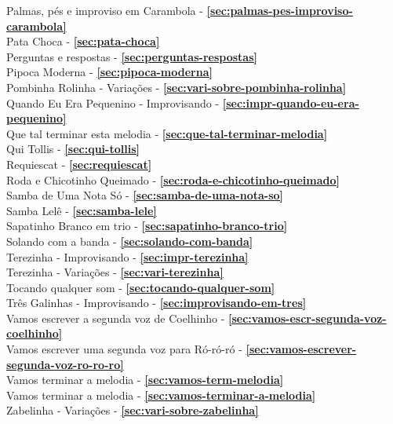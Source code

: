 Palmas, pés e improviso em Carambola - \textbf{\ref{sec:palmas-pes-improviso-carambola}} \\
Pata Choca - \textbf{\ref{sec:pata-choca}} \\
Perguntas e respostas - \textbf{\ref{sec:perguntas-respostas}} \\
Pipoca Moderna - \textbf{\ref{sec:pipoca-moderna}} \\
Pombinha Rolinha - Variações - \textbf{\ref{sec:vari-sobre-pombinha-rolinha}} \\
Quando Eu Era Pequenino - Improvisando - \textbf{\ref{sec:impr-quando-eu-era-pequenino}} \\
Que tal terminar esta melodia - \textbf{\ref{sec:que-tal-terminar-melodia}} \\
Qui Tollis - \textbf{\ref{sec:qui-tollis}} \\
Requiescat - \textbf{\ref{sec:requiescat}} \\
Roda e Chicotinho Queimado - \textbf{\ref{sec:roda-e-chicotinho-queimado}} \\
Samba de Uma Nota Só - \textbf{\ref{sec:samba-de-uma-nota-so}} \\
Samba Lelê - \textbf{\ref{sec:samba-lele}} \\
Sapatinho Branco em trio - \textbf{\ref{sec:sapatinho-branco-trio}} \\
Solando com a banda - \textbf{\ref{sec:solando-com-banda}} \\
Terezinha - Improvisando - \textbf{\ref{sec:impr-terezinha}} \\
Terezinha - Variações - \textbf{\ref{sec:vari-terezinha}} \\
Tocando qualquer som - \textbf{\ref{sec:tocando-qualquer-som}} \\
Três Galinhas - Improvisando - \textbf{\ref{sec:improvisando-em-tres}} \\
Vamos escrever a segunda voz de Coelhinho - \textbf{\ref{sec:vamos-escr-segunda-voz-coelhinho}} \\
Vamos escrever uma segunda voz para Ró-ró-ró - \textbf{\ref{sec:vamos-escrever-segunda-voz-ro-ro-ro}} \\
Vamos terminar a melodia - \textbf{\ref{sec:vamos-term-melodia}} \\
Vamos terminar a melodia - \textbf{\ref{sec:vamos-terminar-a-melodia}} \\
Zabelinha - Variações - \textbf{\ref{sec:vari-sobre-zabelinha}} \\
